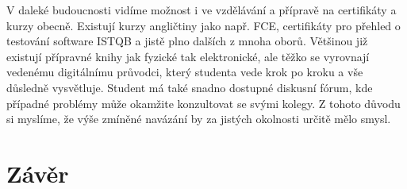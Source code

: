 \documentclass[12pt, a4paper]{report}
\begin{document}
V daleké budoucnosti vidíme možnost i ve vzdělávání a přípravě na certifikáty a kurzy obecně. Existují kurzy angličtiny jako např. FCE, certifikáty pro přehled o testování software ISTQB a jistě plno dalších z mnoha oborů. Většinou již existují přípravné knihy jak fyzické tak elektronické, ale těžko se vyrovnají vedenému digitálnímu průvodci, který studenta vede krok po kroku a vše důsledně vysvětluje. Student má také snadno dostupné diskusní fórum, kde případné problémy může okamžite konzultovat se svými kolegy. Z tohoto důvodu si myslíme, že výše zmíněné navázání by za jistých okolnosti určitě mělo smysl.

\chapter{Závěr}
\label{sec:org79e1146}
\end{document}

